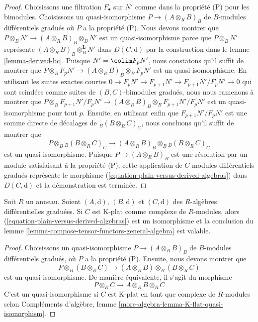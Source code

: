 \begin{proof}
\medskip\noindent
Choisissons une filtration $F_\bullet$ sur $N'$ comme dans la propriété (P) pour
les bimodules. Choisissons un quasi-isomorphisme $P \to (A
\otimes_R B)_B$ de $B$-modules différentiels gradués où $P$ a la propriété
(P). Nous devons montrer
que $P \otimes_B N' \to (A \otimes_R B)_B \otimes_B N'$ est un
quasi-isomorphisme parce que $P \otimes_B N'$ représente $(A
\otimes_R B)_B \otimes_B^\mathbf{L} N'$ dans $D(C, \text{d})$ par la
construction dans le lemme \ref{lemma-derived-bc}. Puisque $N' =
\colim F_pN'$, nous constatons qu'il
suffit de montrer que $P \otimes_B
F_pN' \to (A \otimes_R B)_B \otimes_B F_pN'$ est un
quasi-isomorphisme. En utilisant les suites exactes courtes $0 \to F_pN' \to
F_{p + 1}N' \to F_{p + 1}N'/F_pN' \to 0$ qui sont scindées comme
suites de $(B, C)$-bimodules gradués, nous nous ramenons à montrer que $P
\otimes_B F_{p + 1}N'/F_pN' \to (A
\otimes_R B)_B \otimes_B F_{p + 1}N'/F_pN'$ est un
quasi-isomorphisme pour tout $p$. Ensuite, en
utilisant enfin que $F_{p + 1}N'/F_pN'$ est une somme
directe de décalages de ${}_B(B \otimes_R C)_C$, nous
concluons qu'il suffit de montrer que
$$
P \otimes_B {}_B(B \otimes_R C)_C \to
(A \otimes_R B)_B \otimes_B {}_B(B \otimes_R C)_C
$$
est un quasi-isomorphisme. Puisque $P \to (A \otimes_R B)_B$
est une résolution par un module satisfaisant à la propriété
(P), cette application de $C$-modules différentiels
gradués représente le morphisme (\ref{equation-plain-versus-derived-algebras}) dans
$D(C, \text{d})$ et la démonstration est terminée.
\end{proof}

\begin{lemma}
\label{lemma-compose-tensor-functors}
Soit $R$ un anneau. Soient $(A, \text{d})$, $(B, \text{d})$ et
$(C, \text{d})$ des $R$-algèbres différentielles
graduées. Si $C$ est K-plat comme complexe de $R$-modules,
alors (\ref{equation-plain-versus-derived-algebras})
est un isomorphisme et la conclusion du
lemme \ref{lemma-compose-tensor-functors-general-algebra} est valable.
\end{lemma}

\begin{proof}
Choisissons un quasi-isomorphisme $P \to (A \otimes_R B)_B$ de $B$-modules
différentiels gradués, où $P$ a la propriété (P). Ensuite, nous devons montrer
que
$$
P \otimes_B (B \otimes_R C) \longrightarrow
(A \otimes_R B) \otimes_B (B \otimes_R C)
$$
est un quasi-isomorphisme. De manière équivalente, il s'agit du morphisme
$$
P \otimes_R C \longrightarrow
A \otimes_R B \otimes_R C
$$
C'est un quasi-isomorphisme si $C$ est K-plat en tant que complexe de $R$-modules
selon Compléments d'algèbre, lemme \ref{more-algebra-lemma-K-flat-quasi-isomorphism}.
\end{proof}





